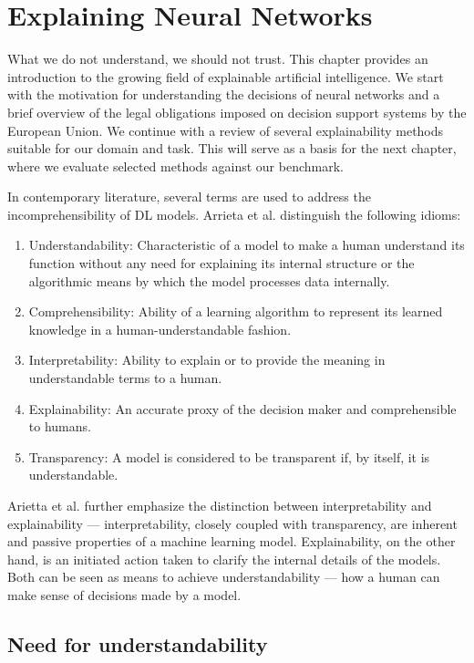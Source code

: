 \chapter{Explaining Neural Networks}

What we do not understand, we should not trust.
This chapter provides an introduction to the growing field of explainable artificial intelligence.
We start with the motivation for understanding the decisions of neural networks and a brief overview of the legal obligations imposed on decision support systems by the European Union.
We continue with a review of several explainability methods suitable for our domain and task.
This will serve as a basis for the next chapter, where we evaluate selected methods against our benchmark.

In contemporary literature, several terms are used to address the incomprehensibility of DL models. Arrieta et al. \cite{arrieta-taxonomy} distinguish the following idioms:

\begin{enumerate}
    \item Understandability: Characteristic of a model to make a human understand its function without any need for explaining its internal structure or the algorithmic means by which the model processes data internally.
    \item Comprehensibility: Ability of a learning algorithm to represent its learned knowledge in a human-understandable fashion.
    \item Interpretability: Ability to explain or to provide the meaning in understandable terms to a human.
    \item Explainability: An accurate proxy of the decision maker and comprehensible to humans.
    \item Transparency: A model is considered to be transparent if, by itself, it is understandable.
\end{enumerate}

Arietta et al. \cite{arrieta-taxonomy} further emphasize the distinction between interpretability and explainability --- interpretability, closely coupled with transparency, are inherent and passive properties of a machine learning model.
Explainability, on the other hand, is an initiated action taken to clarify the internal details of the models.
Both can be seen as means to achieve understandability --- how a human can make sense of decisions made by a model.


\section{Need for understandability}\label{sec:need-for-xai}

